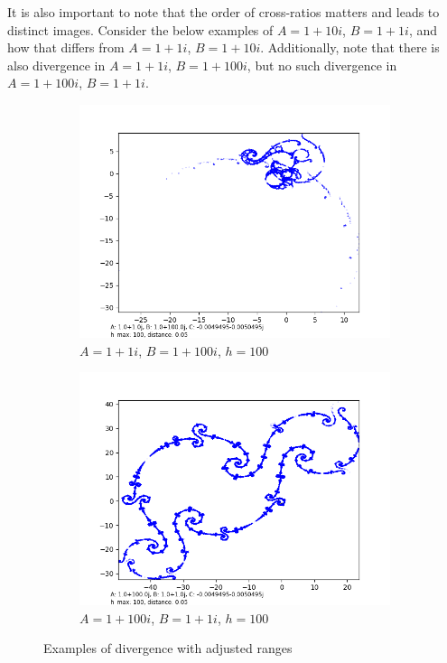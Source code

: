 \documentclass[12pt,a4paper,reqno,parskip=full]{amsart}
\numberwithin{equation}{section}
\theoremstyle{plain}
\theoremstyle{definition}
\begin{document}
It is also important to note that the order of cross-ratios matters and leads to distinct images. Consider the below examples of $A=1+10i$, $B=1+1i$, and how that differs from $A=1+1i$, $B=1+10i$. Additionally, note that there is also divergence in $A=1+1i$, $B=1+100i$, but no such divergence in $A=1+100i$, $B=1+1i$.

\begin{figure}[H]
     \centering
     
     \begin{subfigure}[b]{.49\textwidth}
         \centering
         \includegraphics[width=\textwidth]{images/a1,b100,h100,d.05.png}
         \caption{$A=1+1i$, $B=1+100i$, $h=100$}
         \label{fig:a1b100}
     \end{subfigure}
     \begin{subfigure}[b]{.49\textwidth}
         \centering
        \includegraphics[width=\textwidth]{images/a100,b1,h100,d.05.png}
         \caption{$A=1+100i$, $B=1+1i$, $h=100$}
         \label{fig:a100b1}
     \end{subfigure}
        \caption{Examples of divergence with adjusted ranges}
        \label{fig:divergence-with-ranges}
\end{figure}
\end{document}
